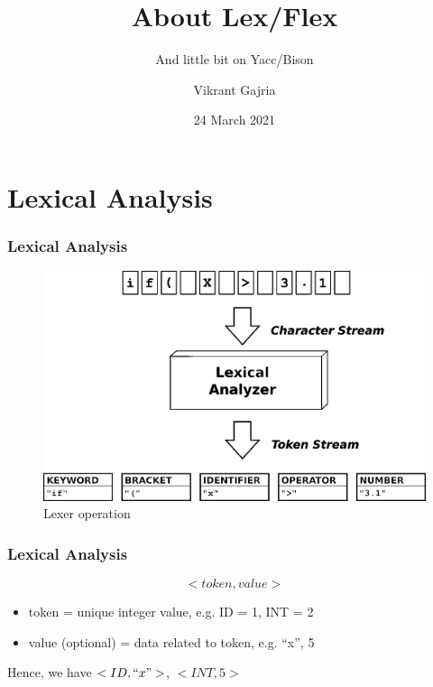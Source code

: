 \documentclass{beamer}
\title[About Lex]{About Lex/Flex}
\subtitle{And little bit on Yacc/Bison}
\author{Vikrant Gajria\inst{1}}
\institute{
    \inst{1} BE Computer Engineering,
    DJSCE
}
\date{24 March 2021}
\begin{document}
\begin{frame}
    \maketitle
\end{frame}

\section{Lexical Analysis}

\begin{frame}
    \frametitle{Lexical Analysis}

    \begin{figure}
        \centering
        \includegraphics[width=\textwidth]{./imgs/lexer.png}
        \caption{Lexer operation}
        \label{fig:lexer}
    \end{figure}
\end{frame}

\begin{frame}
    \frametitle{Lexical Analysis}

    \[ <token, value> \]

    \begin{itemize}
        \item token = unique integer value, e.g. ID = 1, INT = 2
        \item value (optional) = data related to token, e.g. ``x'', 5
    \end{itemize}

    Hence, we have $<ID, ``x">$, $<INT, 5>$
\end{frame}
\end{document}
